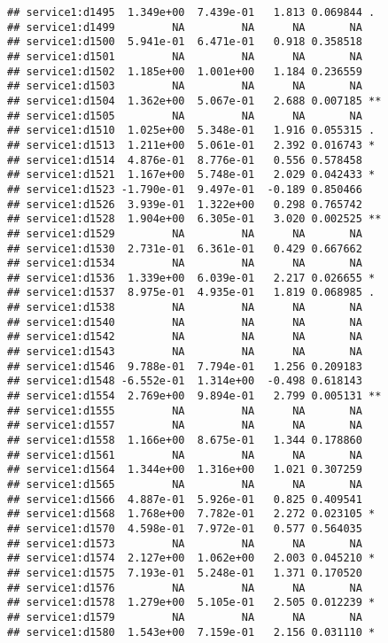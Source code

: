 \documentclass[
]{article}
\begin{document}
\begin{verbatim}
## service1:d1495  1.349e+00  7.439e-01   1.813 0.069844 .  
## service1:d1499         NA         NA      NA       NA    
## service1:d1500  5.941e-01  6.471e-01   0.918 0.358518    
## service1:d1501         NA         NA      NA       NA    
## service1:d1502  1.185e+00  1.001e+00   1.184 0.236559    
## service1:d1503         NA         NA      NA       NA    
## service1:d1504  1.362e+00  5.067e-01   2.688 0.007185 ** 
## service1:d1505         NA         NA      NA       NA    
## service1:d1510  1.025e+00  5.348e-01   1.916 0.055315 .  
## service1:d1513  1.211e+00  5.061e-01   2.392 0.016743 *  
## service1:d1514  4.876e-01  8.776e-01   0.556 0.578458    
## service1:d1521  1.167e+00  5.748e-01   2.029 0.042433 *  
## service1:d1523 -1.790e-01  9.497e-01  -0.189 0.850466    
## service1:d1526  3.939e-01  1.322e+00   0.298 0.765742    
## service1:d1528  1.904e+00  6.305e-01   3.020 0.002525 ** 
## service1:d1529         NA         NA      NA       NA    
## service1:d1530  2.731e-01  6.361e-01   0.429 0.667662    
## service1:d1534         NA         NA      NA       NA    
## service1:d1536  1.339e+00  6.039e-01   2.217 0.026655 *  
## service1:d1537  8.975e-01  4.935e-01   1.819 0.068985 .  
## service1:d1538         NA         NA      NA       NA    
## service1:d1540         NA         NA      NA       NA    
## service1:d1542         NA         NA      NA       NA    
## service1:d1543         NA         NA      NA       NA    
## service1:d1546  9.788e-01  7.794e-01   1.256 0.209183    
## service1:d1548 -6.552e-01  1.314e+00  -0.498 0.618143    
## service1:d1554  2.769e+00  9.894e-01   2.799 0.005131 ** 
## service1:d1555         NA         NA      NA       NA    
## service1:d1557         NA         NA      NA       NA    
## service1:d1558  1.166e+00  8.675e-01   1.344 0.178860    
## service1:d1561         NA         NA      NA       NA    
## service1:d1564  1.344e+00  1.316e+00   1.021 0.307259    
## service1:d1565         NA         NA      NA       NA    
## service1:d1566  4.887e-01  5.926e-01   0.825 0.409541    
## service1:d1568  1.768e+00  7.782e-01   2.272 0.023105 *  
## service1:d1570  4.598e-01  7.972e-01   0.577 0.564035    
## service1:d1573         NA         NA      NA       NA    
## service1:d1574  2.127e+00  1.062e+00   2.003 0.045210 *  
## service1:d1575  7.193e-01  5.248e-01   1.371 0.170520    
## service1:d1576         NA         NA      NA       NA    
## service1:d1578  1.279e+00  5.105e-01   2.505 0.012239 *  
## service1:d1579         NA         NA      NA       NA    
## service1:d1580  1.543e+00  7.159e-01   2.156 0.031110 *  

\end{verbatim}
\end{document}
